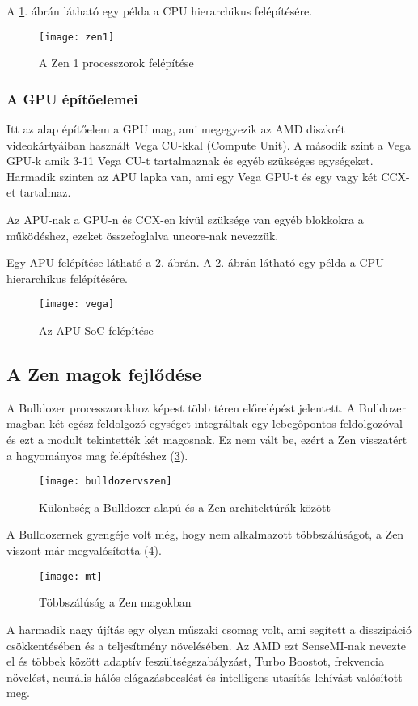 A \ref{fig:zen1}. ábrán látható egy példa a CPU hierarchikus felépítésére.
\begin{figure}[H]
    \texttt{[image: zen1]}
    \centering
    \caption{A Zen 1 processzorok felépítése}
    \label{fig:zen1}
\end{figure}

\subsubsection{A GPU építőelemei}
Itt az alap építőelem a GPU mag, ami megegyezik az AMD diszkrét videokártyáiban használt Vega CU-kkal (Compute Unit).
A második szint a Vega GPU-k amik 3-11 Vega CU-t tartalmaznak és egyéb szükséges egységeket.
Harmadik szinten az APU lapka van, ami egy Vega GPU-t és egy vagy két CCX-et tartalmaz.

Az APU-nak a GPU-n és CCX-en kívül szüksége van egyéb blokkokra a működéshez, ezeket összefoglalva uncore-nak nevezzük.

Egy APU felépítése látható a \ref{fig:vega}. ábrán.
A \ref{fig:vega}. ábrán látható egy példa a CPU hierarchikus felépítésére.
\begin{figure}[H]
    \texttt{[image: vega]}
    \centering
    \caption{Az APU SoC felépítése}
    \label{fig:vega}
\end{figure}

\subsection{A Zen magok fejlődése}
A Bulldozer processzorokhoz képest több téren előrelépést jelentett.
A Bulldozer magban két egész feldolgozó egységet integráltak egy lebegőpontos feldolgozóval és ezt a modult tekintették két magosnak.
Ez nem vált be, ezért a Zen visszatért a hagyományos mag felépítéshez (\ref{fig:bulldozervszen}).
\begin{figure}[H]
    \texttt{[image: bulldozervszen]}
    \centering
    \caption{Különbség a Bulldozer alapú és a Zen architektúrák között}
    \label{fig:bulldozervszen}
\end{figure}
A Bulldozernek gyengéje volt még, hogy nem alkalmazott többszálúságot, a Zen viszont már megvalósította (\ref{fig:mt}).
\begin{figure}[H]
    \texttt{[image: mt]}
    \centering
    \caption{Többszálúság a Zen magokban}
    \label{fig:mt}
\end{figure}
A harmadik nagy újítás egy olyan műszaki csomag volt, ami segített a disszipáció csökkentésében és a teljesítmény növelésében.
Az AMD ezt SenseMI-nak nevezte el és többek között adaptív feszültségszabályzást, Turbo Boostot, frekvencia növelést, neurális hálós elágazásbecslést és intelligens utasítás lehívást valósított meg.

